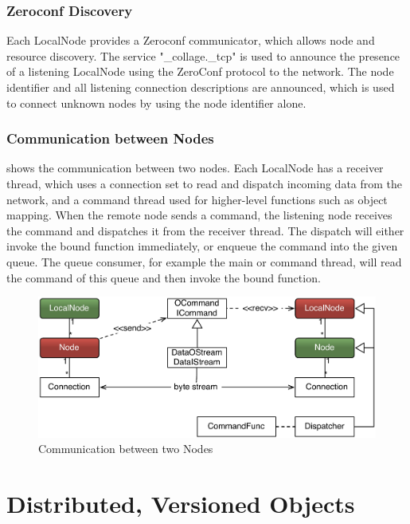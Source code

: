 \subsubsection{\label{sZeroconf}Zeroconf Discovery}

Each \textsf{LocalNode} provides a \textsf{Zeroconf} communicator, which allows
node and resource discovery. The service "\_collage.\_tcp" is used to announce
the presence of a listening \textsf{LocalNode} using the ZeroConf protocol to
the network. The node identifier and all listening connection descriptions are
announced, which is used to connect unknown nodes by using the node identifier
alone.

\subsubsection{Communication between Nodes}

 shows the communication between two nodes. Each
\textsf{LocalNode} has a receiver thread, which uses a connection set to read
and dispatch incoming data from the network, and a command thread used for
higher-level functions such as object mapping. When the remote node sends a
command, the listening node receives the command and dispatches it from the
receiver thread. The dispatch will either invoke the bound function immediately,
or enqueue the command into the given queue. The queue consumer, for example the
main or command thread, will read the command of this queue and then invoke the
bound function.

\begin{figure}[h!t]\center
  \includegraphics[width=\textwidth]{images/netNode.pdf}
  {\caption{\label{fNetNode}Communication between two Nodes}}
\end{figure}


\section{Distributed, Versioned Objects}


